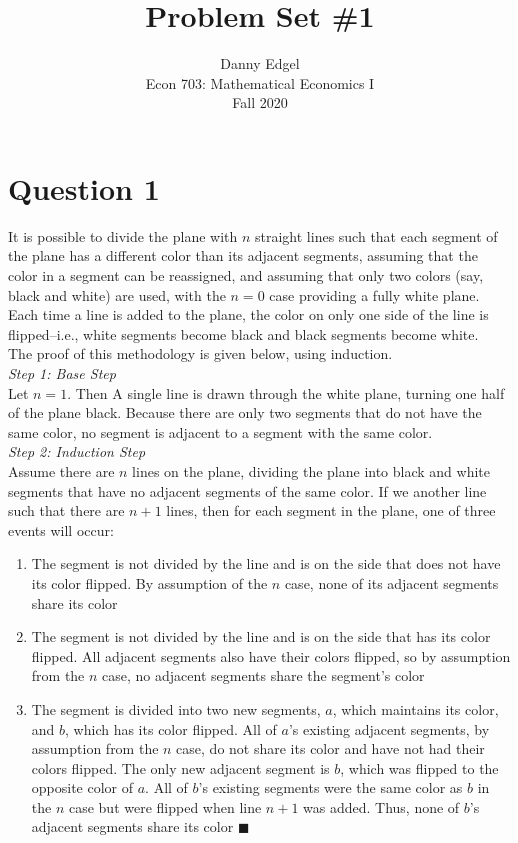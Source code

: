\documentclass{article}
\begin{document}
\title{	Problem Set \#1 }
\author{ 	Danny Edgel 							\\ 
			Econ 703: Mathematical Economics I		\\
			Fall 2020								\\
		}
\maketitle\thispagestyle{empty}



\section*{Question 1}

It is possible to divide the plane with $n$ straight lines such that each segment of the plane has a different color than its adjacent segments, assuming that the color in a segment can be reassigned, and assuming that only two colors (say, black and white) are used, with the $n=0$ case providing a fully white plane. Each time a line is added to the plane, the color on only one side of the line is flipped--i.e., white segments become black and black segments become white.
\medskip \\
The proof of this methodology is given below, using induction. 
\medskip \\
\textit{Step 1: Base Step} \\
Let $n=1$. Then A single line is drawn through the white plane, turning one half of the plane black. Because there are only two segments that do not have the same color, no segment is adjacent to a segment with the same color.
\medskip \\
\textit{Step 2: Induction Step} \\
Assume there are $n$ lines on the plane, dividing the plane into black and white segments that have no adjacent segments of the same color. If we another line such that there are $n+1$ lines, then for each segment in the plane, one of three events will occur: 
\begin{enumerate}
	\item The segment is not divided by the line and is on the side that does not have its color flipped. By assumption of the $n$ case, none of its adjacent segments share its color
	\item The segment is not divided by the line and is on the side that has its color flipped. All adjacent segments also have their colors flipped, so by assumption from the $n$ case, no adjacent segments share the segment's color
	\item The segment is divided into two new segments, $a$, which maintains its color, and $b$, which has its color flipped. All of $a$'s existing adjacent segments, by assumption from the $n$ case, do not share its color and have not had their colors flipped. The only new adjacent segment is $b$, which was flipped to the opposite color of $a$. All of $b$'s existing segments were the same color as $b$ in the $n$ case but were flipped when line $n+1$ was added. Thus, none of $b$'s adjacent segments share its color $\blacksquare$
\end{enumerate}
\end{document}
